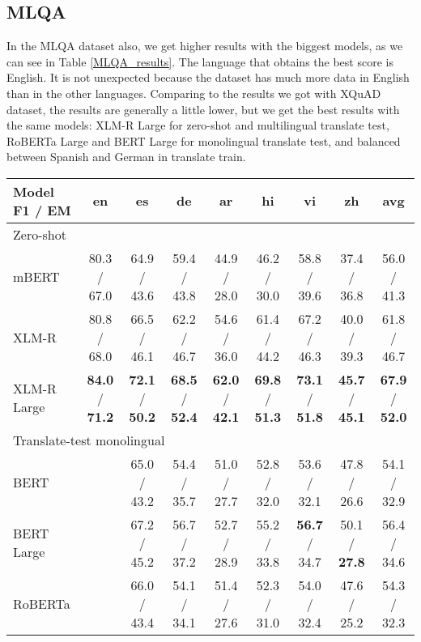 \documentclass[11pt]{article}
\begin{document}
\subsection{MLQA}

In the MLQA dataset also, we get higher results with the biggest models, as we can see in Table \ref{MLQA_results}. The language that obtains the best score is English. It is not unexpected because the dataset has much more data in English than in the other languages.
Comparing to the results we got with XQuAD dataset, the results are generally a little lower, but we get the best results with the same models: XLM-R Large for zero-shot and multilingual translate test, RoBERTa Large and BERT Large for monolingual translate test, and balanced between Spanish and German in translate train.

\begin{table*}[!ht]
    \centering
    \begin{adjustbox}{max width=\textwidth}
    \begin{tabular}{l|ccccccc|c}
        \toprule
        Model F1 / EM & en & es & de & ar & hi & vi & zh & avg \\
        \midrule
        \multicolumn{9}{l}{Zero-shot} \\
        \midrule
        mBERT & 80.3 / 67.0 & 64.9 / 43.6 & 59.4 / 43.8 & 44.9 / 28.0 & 46.2 / 30.0 & 58.8 / 39.6 & 37.4 / 36.8 & 56.0 / 41.3 \\
        XLM-R & 80.8 / 68.0 & 66.5 / 46.1 & 62.2 / 46.7 & 54.6 / 36.0 & 61.4 / 44.2 & 67.2 / 46.3 & 40.0 / 39.3 & 61.8 / 46.7 \\
        XLM-R Large & \textbf{84.0} / \textbf{71.2} & \textbf{72.1} / \textbf{50.2} & \textbf{68.5} / \textbf{52.4} & \textbf{62.0} / \textbf{42.1} & \textbf{69.8} / \textbf{51.3} & \textbf{73.1} / \textbf{51.8} & \textbf{45.7} / \textbf{45.1} & \textbf{67.9} / \textbf{52.0} \\
        \midrule
        \multicolumn{9}{l}{Translate-test monolingual} \\
        \midrule
        BERT & ~ & 65.0 / 43.2 & 54.4 / 35.7 & 51.0 / 27.7 & 52.8 / 32.0 & 53.6 / 32.1 & 47.8 / 26.6 & 54.1 / 32.9 \\
        BERT Large & ~ & 67.2 / 45.2 & 56.7 / 37.2 & 52.7 / 28.9 & 55.2 / 33.8 & \textbf{56.7} / 34.7 & 50.1 / \textbf{27.8} & 56.4 / 34.6 \\
        RoBERTa & ~ & 66.0 / 43.4 & 54.1 / 34.1 & 51.4 / 27.6 & 52.3 / 31.0 & 54.0 / 32.4 & 47.6 / 25.2 & 54.3 / 32.3 \\

\end{tabular}
\end{adjustbox}
\end{table*}
\end{document}
